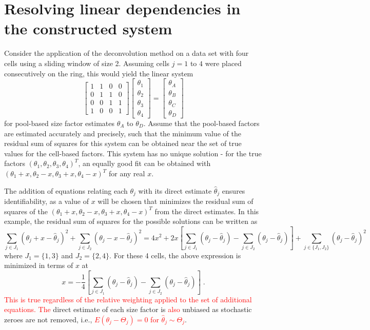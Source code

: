 \documentclass{article}
\newcommand\revised[1]{\textcolor{red}{#1}}
\begin{document}
\section{Resolving linear dependencies in the constructed system}
Consider the application of the deconvolution method on a data set with four cells using a sliding window of size 2.
Assuming cells $j=1$ to $4$ were placed consecutively on the ring, this would yield the linear system
\[
\begin{bmatrix}
1 & 1 & 0 & 0 \\
0 & 1 & 1 & 0 \\
0 & 0 & 1 & 1 \\
1 & 0 & 0 & 1 
\end{bmatrix}
\begin{bmatrix}
\theta_1 \\
\theta_2 \\
\theta_3 \\
\theta_4 
\end{bmatrix}
=
\begin{bmatrix}
\theta_A \\
\theta_B \\
\theta_C \\
\theta_D 
\end{bmatrix}
\]
for pool-based size factor estimates $\theta_A$ to $\theta_D$. 
Assume that the pool-based factors are estimated accurately and precisely, such that the minimum value of the residual sum of squares for this system can be obtained near the set of true values for the cell-based factors.
This system has no unique solution - for the true factors $(\theta_1, \theta_2, \theta_3, \theta_4)^T$, 
    an equally good fit can be obtained with $(\theta_1+x, \theta_2-x, \theta_3+x, \theta_4 - x)^T$ for any real $x$.

The addition of equations relating each $\theta_j$ with its direct estimate $\hat\theta_j$ ensures identifiability, 
    as a value of $x$ will be chosen that minimizes the residual sum of squares of the $(\theta_1+x, \theta_2-x, \theta_3+x, \theta_4 - x)^T$ from the direct estimates.
In this example, the residual sum of squares for the possible solutions can be written as
\[
\sum_{j \in J_1} (\theta_j +x - \hat\theta_j)^2+ \sum_{j \in J_2} (\theta_j -x - \hat\theta_j)^2 
= 4 x^2 + 2x\left[ \sum_{j \in J_1} (\theta_j - \hat\theta_j) - \sum_{j \in J_2} (\theta_j - \hat\theta_j)\right] + \sum_{j \in \{J_1, J_2\}} (\theta_j - \hat\theta_j)^2
\]
where $J_1 = \{1, 3\}$ and $J_2=\{2, 4\}$.
For these 4 cells, the above expression is minimized in terms of $x$ at
\[
x = - \frac{1}{4}\left[ \sum_{j \in J_1} (\theta_j - \hat\theta_j) - \sum_{j \in J_2} (\theta_j - \hat\theta_j)\right] \;.
\]
\revised{This is true regardless of the relative weighting applied to the set of additional equations.
The} direct estimate of each size factor is \revised{also} unbiased as stochastic zeroes are not removed, i.e., \revised{$E(\theta_j - \Theta_j)=0$ for $\hat\theta_j \sim \Theta_j$}.
\end{document}
